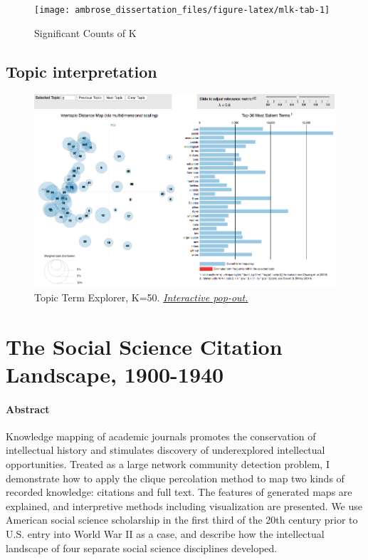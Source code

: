 \documentclass[]{book}
\theoremstyle{definition}
\theoremstyle{definition}
\theoremstyle{definition}
\theoremstyle{remark}
\begin{document}
\begin{figure}

{\centering \texttt{[image: ambrose\_dissertation\_files/figure-latex/mlk-tab-1]} 

}

\caption{Significant Counts of K}\label{fig:mlk-tab}
\end{figure}

\hypertarget{topic-interpretation-1}{%
\section{\texorpdfstring{ Topic
interpretation}{ Topic interpretation}}\label{topic-interpretation-1}}




\begin{figure}

{\centering \includegraphics[width=0.9\linewidth]{img/soc-mod-viz} 

}

\caption{Topic Term Explorer, K=50.
\href{exh/viz/index.html}{\emph{Interactive pop-out.}}}\label{fig:soc-mod-viz}
\end{figure}

\hypertarget{cit}{%
\chapter{The Social Science Citation Landscape, 1900-1940}\label{cit}}

\hypertarget{abstract-4}{%
\subsubsection*{Abstract}\label{abstract-4}}


Knowledge mapping of academic journals promotes the
conservation of intellectual history and stimulates discovery of
underexplored intellectual opportunities. Treated as a large network
community detection problem, I demonstrate how to apply the clique
percolation method to map two kinds of recorded knowledge: citations and
full text. The features of generated maps are explained, and
interpretive methods including visualization are presented. We use
American social science scholarship in the first third of the 20th
century prior to U.S. entry into World War II as a case, and describe
how the intellectual landscape of four separate social science
disciplines developed.
\end{document}

